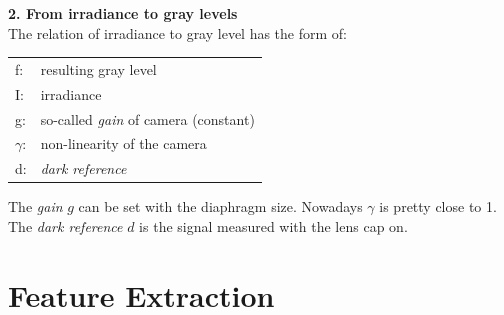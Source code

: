 \documentclass[a4paper, fontsize=8pt, landscape, DIV=1]{scrartcl}
\begin{document}
\begin{multicols*}{4}
		\textbf{2. From irradiance to gray levels}\\
		The relation of irradiance to gray level has the form of: 
		\begin{tabular}{l l}
			f:&  resulting gray level\\ 
			I:&  irradiance\\ 
			g:&  so-called \textit{gain} of camera (constant)\\ 
			$\gamma$:&  non-linearity of the camera \\ 
			d:&  \textit{dark reference}\\  
		\end{tabular}
		\par 
		The \textit{gain} $g$ can be set with the diaphragm size. Nowadays $\gamma$ is pretty close to 1. The \textit{dark reference} $d$ is the signal measured with the lens cap on. 
		\par 
		
		
		\section{Feature Extraction}	
		
		 
		
	\end{multicols*}
	\setcounter{secnumdepth}{3}
\end{document}
